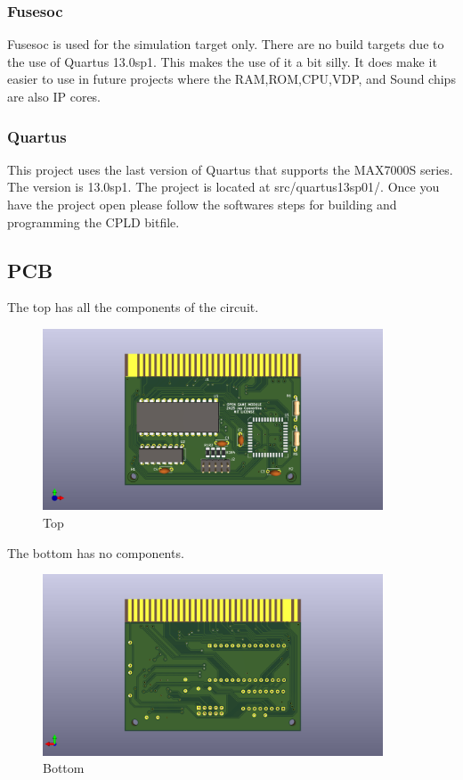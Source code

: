 \subsubsection{Fusesoc}
\par
Fusesoc is used for the simulation target only. There are no build targets due to the use of Quartus 13.0sp1.
This makes the use of it a bit silly. It does make it easier to use in future projects where the RAM,ROM,CPU,VDP,
and Sound chips are also IP cores.



\subsubsection{Quartus}
\par
This project uses the last version of Quartus that supports the MAX7000S series. The version is 13.0sp1.
The project is located at src/quartus13sp01/. Once you have the project open please follow the softwares steps
for building and programming the CPLD bitfile.

\subsection{PCB}

\par
The top has all the components of the circuit.

\begin{figure}[h!]
\caption{Top}
\centering
\includegraphics[width=0.90\textwidth,keepaspectratio]{img/ogm_top.png}
\end{figure}

\par
The bottom has no components.

\begin{figure}[h!]
\caption{Bottom}
\centering
\includegraphics[width=0.90\textwidth,keepaspectratio]{img/ogm_bottom.png}
\end{figure}

